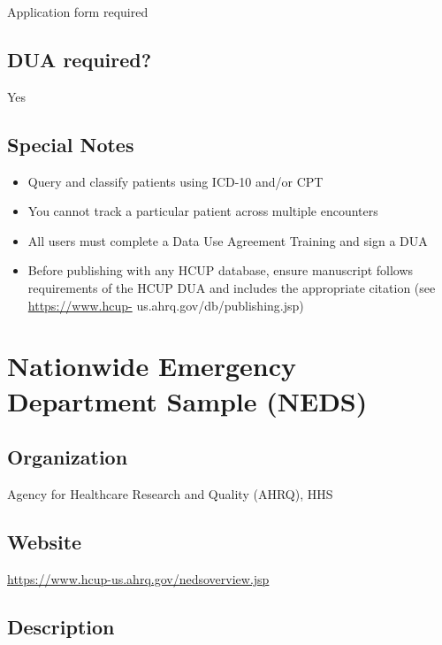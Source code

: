 \documentclass[
]{book}
\providecommand{\tightlist}{%
  \setlength{\itemsep}{0pt}\setlength{\parskip}{0pt}}
\begin{document}
Application form required

\hypertarget{dua-required-68}{%
\section{DUA required?}\label{dua-required-68}}

Yes

\hypertarget{special-notes-68}{%
\section{Special Notes}\label{special-notes-68}}

\begin{itemize}
\tightlist
\item
  Query and classify patients using ICD-10 and/or CPT
\item
  You cannot track a particular patient across multiple encounters
\item
  All users must complete a Data Use Agreement Training and sign a DUA
\item
  Before publishing with any HCUP database, ensure manuscript follows requirements of the HCUP DUA and includes the appropriate citation (see \url{https://www.hcup-} us.ahrq.gov/db/publishing.jsp)
\end{itemize}

\mainmatter

\hypertarget{nationwide-emergency-department-sample-neds}{%
\chapter{Nationwide Emergency Department Sample (NEDS)}\label{nationwide-emergency-department-sample-neds}}

\hypertarget{organization-69}{%
\section{Organization}\label{organization-69}}

Agency for Healthcare Research and Quality (AHRQ), HHS

\hypertarget{website-69}{%
\section{Website}\label{website-69}}

\url{https://www.hcup-us.ahrq.gov/nedsoverview.jsp}

\hypertarget{description-69}{%
\section{Description}\label{description-69}}
\end{document}
